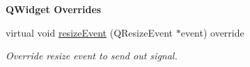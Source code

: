 \begin{Indent}\textbf{ Q\+Widget Overrides}\par
\begin{DoxyCompactItemize}
\item 
\mbox{\label{classrev_1_1_view_1_1_g_l_widget_a5718a1a6a9c8822d73c115f01f3b7ddd}} 
virtual void \mbox{\hyperlink{classrev_1_1_view_1_1_g_l_widget_a5718a1a6a9c8822d73c115f01f3b7ddd}{resize\+Event}} (Q\+Resize\+Event $\ast$event) override
\begin{DoxyCompactList}\small\item\em Override resize event to send out signal. \end{DoxyCompactList}\end{DoxyCompactItemize}
\end{Indent}
